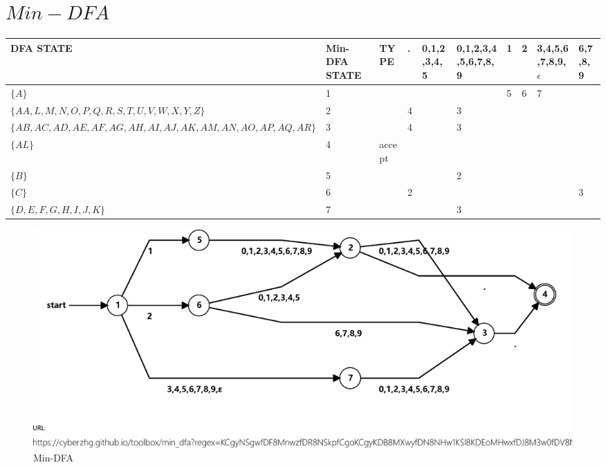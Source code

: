 \documentclass[a3paper]{report}
\begin{document}
\pagebreak
\section*{$Min-DFA$}
\begin{table}[h]
    \centering
    \begin{tabular}{| l | l | l | l | l | l | l | l | l | l |}
        \hline
        DFA STATE                                             & Min-DFA STATE & TYPE   & . & 0,1,2,3,4,5 & 0,1,2,3,4,5,6,7,8,9 & 1 & 2 & 3,4,5,6,7,8,9,$\epsilon$ & 6,7,8,9 \\ \hline
        $\{A\}$                                               & 1             &        &   &             &                     & 5 & 6 & 7                        &         \\
        $\{AA,L,M,N,O,P,Q,R,S,T,U,V,W,X,Y,Z\}$                & 2             &        & 4 &             & 3                   &   &   &                          &         \\
        $\{AB,AC,AD,AE,AF,AG,AH,AI,AJ,AK,AM,AN,AO,AP,AQ,AR\}$ & 3             &        & 4 &             & 3                   &   &   &                          &         \\
        $\{AL\}$                                              & 4             & accept &   &             &                     &   &   &                          &         \\
        $\{B\}$                                               & 5             &        &   &             & 2                   &   &   &                          &         \\
        $\{C\}$                                               & 6             &        & 2 &             &                     &   &   &                          & 3       \\
        $\{D,E,F,G,H,I,J,K\}$                                 & 7             &        &   &             & 3                   &   &   &                          &         \\
        \hline
    \end{tabular}
\end{table}

\begin{figure}[h]
    \centering
    \includegraphics[scale=1,clip,trim=0 1.8cm 0 0]{Automatas/automata_02.pdf}
    \caption{Min-DFA}
\end{figure}
\end{document}
